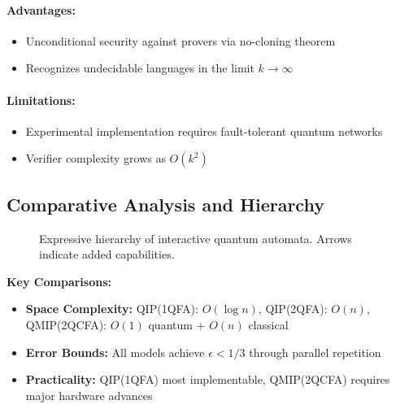 \paragraph{Advantages:}
\begin{itemize}
    \item Unconditional security against provers via no-cloning theorem
    \item Recognizes undecidable languages in the limit $k \rightarrow \infty$
\end{itemize}

\paragraph{Limitations:}
\begin{itemize}
    \item Experimental implementation requires fault-tolerant quantum networks
    \item Verifier complexity grows as $O(k^2)$
\end{itemize}

\subsection*{Comparative Analysis and Hierarchy}
\begin{figure}[h]
\centering
{}

\caption{Expressive hierarchy of interactive quantum automata. Arrows indicate added capabilities.}
\label{fig:interactive-hierarchy}
\end{figure}

\textbf{Key Comparisons:}
\begin{itemize}
    \item \textbf{Space Complexity:} QIP(1QFA): $O(\log n)$, QIP(2QFA): $O(n)$, QMIP(2QCFA): $O(1)$ quantum + $O(n)$ classical
    \item \textbf{Error Bounds:} All models achieve $\epsilon < 1/3$ through parallel repetition
    \item \textbf{Practicality:} QIP(1QFA) most implementable, QMIP(2QCFA) requires major hardware advances
\end{itemize}